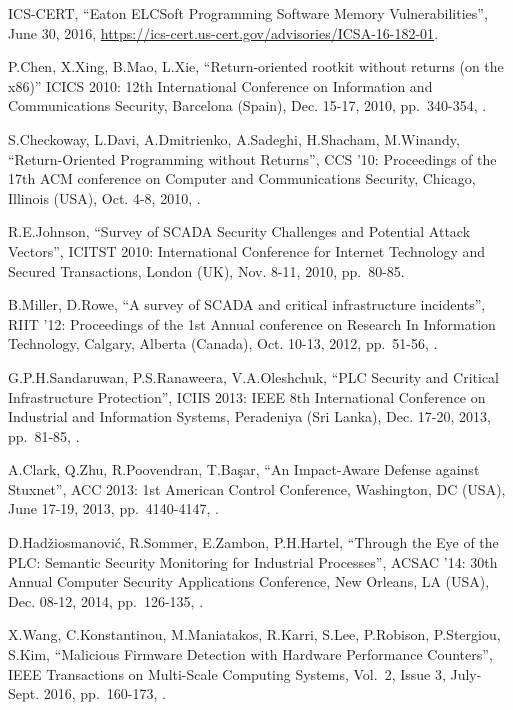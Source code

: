\begin{thebibliography}{99}
ICS-CERT,
``Eaton ELCSoft Programming Software Memory Vulnerabilities'',
June 30, 2016,
\url{https://ics-cert.us-cert.gov/advisories/ICSA-16-182-01}.

P.Chen, X.Xing, B.Mao, L.Xie,
``Return-oriented rootkit without returns (on the x86)''
ICICS 2010: 12th International Conference on Information and Communications Security,
Barcelona (Spain), Dec. 15-17, 2010,
pp.\ 340-354,
.

S.Checkoway, L.Davi, A.Dmitrienko, A.Sadeghi, H.Shacham, M.Winandy,
``Return-Oriented Programming without Returns'',
CCS '10: Proceedings of the 17th ACM conference on Computer and Communications Security,
Chicago, Illinois (USA), Oct. 4-8, 2010,
.

R.E.Johnson,
``Survey of SCADA Security Challenges and Potential Attack Vectors'',
ICITST 2010: International Conference for Internet Technology and Secured Transactions,
London (UK), Nov. 8-11, 2010,
pp.\ 80-85.

B.Miller, D.Rowe,
``A survey of SCADA and critical infrastructure incidents'',
RIIT '12: Proceedings of the 1st Annual conference on Research In Information Technology,
Calgary, Alberta (Canada), Oct. 10-13, 2012,
pp.\ 51-56,
.

G.P.H.Sandaruwan, P.S.Ranaweera, V.A.Oleshchuk,
``PLC Security and Critical Infrastructure Protection'',
ICIIS 2013: IEEE 8th International Conference on Industrial and Information Systems,
Peradeniya (Sri Lanka), Dec. 17-20, 2013,
pp.\ 81-85,
.

A.Clark, Q.Zhu, R.Poovendran, T.Başar,
``An Impact-Aware Defense against Stuxnet'',
ACC 2013: 1st American Control Conference,
Washington, DC (USA), June 17-19, 2013,
pp.\ 4140-4147,
.

D.Hadžiosmanović, R.Sommer, E.Zambon, P.H.Hartel,
``Through the Eye of the PLC: Semantic Security Monitoring for Industrial Processes'',
ACSAC '14: 30th Annual Computer Security Applications Conference,
New Orleans, LA (USA), Dec. 08-12, 2014,
pp.\ 126-135,
.

X.Wang, C.Konstantinou, M.Maniatakos, R.Karri, S.Lee, P.Robison, P.Stergiou, S.Kim,
``Malicious Firmware Detection with Hardware Performance Counters'',
IEEE Transactions on Multi-Scale Computing Systems,
Vol.\ 2, Issue 3,
July-Sept. 2016,
pp.\ 160-173,
.


\end{thebibliography}
